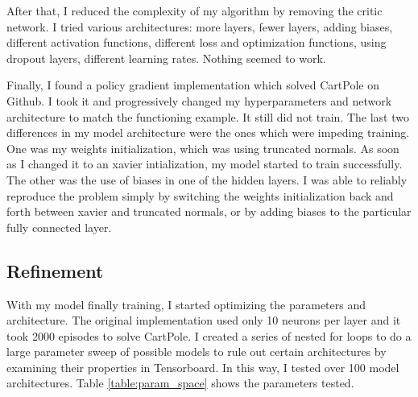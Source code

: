 \documentclass[12pt,a4paper]{article}
\begin{document}
After that, I reduced the complexity of my algorithm by removing the critic network. I tried various architectures: more layers, fewer layers, adding biases, different activation functions, different loss and optimization functions, using dropout layers, different learning rates. Nothing seemed to work.

Finally, I found a policy gradient implementation which solved CartPole on Github.\cite{gh_pg} I took it and progressively changed my hyperparameters and network architecture to match the functioning example. It still did not train. The last two differences in my model architecture were the ones which were impeding training. One was my weights initialization, which was using truncated normals. As soon as I changed it to an xavier intialization, my model started to train successfully. The other was the use of biases in one of the hidden layers. I was able to reliably reproduce the problem simply by switching the weights initialization back and forth between xavier and truncated normals, or by adding biases to the particular fully connected layer.



\subsection*{Refinement}



With my model finally training, I started optimizing the parameters and architecture. The original implementation used only 10 neurons per layer and it took 2000 episodes to solve CartPole. I created a series of nested for loops to do a large parameter sweep of possible models to rule out certain architectures by examining their properties in Tensorboard. In this way, I tested over 100 model architectures. Table \ref{table:param_space} shows the parameters tested.
\end{document}
